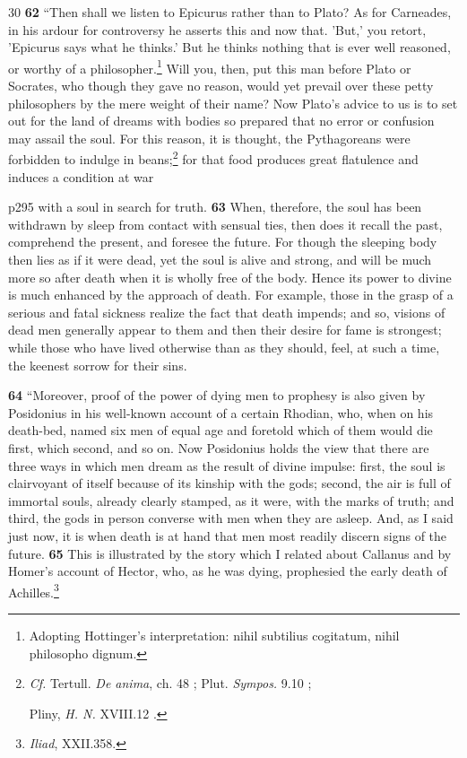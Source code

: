 30
\textbf{62} ``Then shall we listen to Epicurus rather than to Plato? As for Carneades, in his ardour for controversy he asserts this and now that. 'But,' you retort, 'Epicurus says what he thinks.' But he thinks nothing that is ever well reasoned, or worthy of a philosopher.\texthebrew{}\footnote{Adopting Hottinger's interpretation: nihil subtilius cogitatum, nihil philosopho dignum.

} Will you, then, put this man before Plato or Socrates, who though they gave no reason, would yet prevail over these petty philosophers by the mere weight of their name? Now Plato's advice to us is to set out for the land of dreams with bodies so prepared that no error or confusion may assail the soul. For this reason, it is thought, the Pythagoreans were forbidden to indulge in beans;\texthebrew{}\footnote{\emph{Cf.} Tertull. \emph{De anima}, ch. 48 ; Plut. \emph{Sympos.} 9.10 ;

Pliny, \emph{H. N.} XVIII.12 .

} for that food produces great flatulence and induces a condition at war

p295 with a soul in search for truth. \textbf{63} When, therefore, the soul has been withdrawn by sleep from contact with sensual ties, then does it recall the past, comprehend the present, and foresee the future. For though the sleeping body then lies as if it were dead, yet the soul is alive and strong, and will be much more so after death when it is wholly free of the body. Hence its power to divine is much enhanced by the approach of death. For example, those in the grasp of a serious and fatal sickness realize the fact that death impends; and so, visions of dead men generally appear to them and then their desire for fame is strongest; while those who have lived otherwise than as they should, feel, at such a time, the keenest sorrow for their sins.

\textbf{64} ``Moreover, proof of the power of dying men to prophesy is also given by Posidonius in his well-known account of a certain Rhodian, who, when on his death-bed, named six men of equal age and foretold which of them would die first, which second, and so on. Now Posidonius holds the view that there are three ways in which men dream as the result of divine impulse: first, the soul is clairvoyant of itself because of its kinship with the gods; second, the air is full of immortal souls, already clearly stamped, as it were, with the marks of truth; and third, the gods in person converse with men when they are asleep. And, as I said just now, it is when death is at hand that men most readily discern signs of the future. \textbf{65} This is illustrated by the story which I related about Callanus and by Homer's account of Hector, who, as he was dying, prophesied the early death of Achilles.\footnote{\emph{Iliad}, XXII.358.

}

